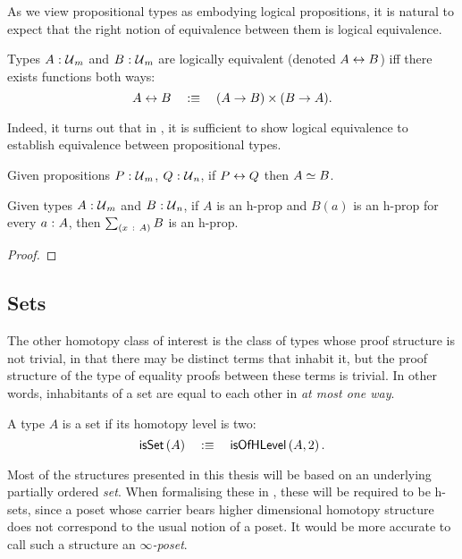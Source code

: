 As we view propositional types as embodying logical propositions, it is natural to
expect that the right notion of equivalence between them is logical equivalence.
\begin{defn}\label{defn:iff}
  Types $A\hspace{0.1mm}:\hspace{0.1mm}\mathcal{U}{}_m$ and $B\hspace{0.1mm}:\hspace{0.1mm}\mathcal{U}{}_m$ are logically equivalent
  (denoted $A \leftrightarrow B$) iff there exists functions both ways:
  \begin{equation*}
    A \leftrightarrow B \quad:\equiv\quad (A \rightarrow B) \times (B \rightarrow A).
  \end{equation*}
\end{defn}
Indeed, it turns out that in \UF{}, it is sufficient to show logical equivalence to
establish equivalence between propositional types.
\begin{prop}\label{prop:iff-equiv}
  Given propositions $P\hspace{0.1mm}:\hspace{0.1mm}\mathcal{U}{}_m$, $Q\hspace{0.1mm}:\hspace{0.1mm}\mathcal{U}{}_n$, if $P \leftrightarrow Q$
  then $A \simeq B$.
\end{prop}

\begin{prop}\label{prop:sigma-prop}
  Given types $A\hspace{0.1mm}:\hspace{0.1mm}\mathcal{U}{}_m$ and $B\hspace{0.1mm}:\hspace{0.1mm}\mathcal{U}{}_n$, if $A$ is an h-prop and
  $B(a)$ is an h-prop for every $a\hspace{0.1mm}:\hspace{0.1mm}A$, then $\sum_{(x~:~A)} B$ is an h-prop.
\end{prop}
\begin{proof}
\end{proof}

\subsection{Sets}

The other homotopy class of interest is the class of types whose proof structure is not
trivial, in that there may be distinct terms that inhabit it, but the proof structure of
the type of equality proofs between these terms is trivial. In other words, inhabitants of
a set are equal to each other in \emph{at most one way}.
\begin{defn}[Set]\label{defn:hset}
  A type $A$ is a set if its homotopy level is two:
  \begin{equation*}
    \mathsf{isSet}\left(A\right) \quad:\equiv\quad \mathsf{isOfHLevel}\left(A, 2\right).
  \end{equation*}
\end{defn}

Most of the structures presented in this thesis will be based on an underlying partially
ordered \emph{set}. When formalising these in \UF{}, these will be required to be h-sets,
since a poset whose carrier bears higher dimensional homotopy structure does not
correspond to the usual notion of a poset. It would be more accurate to call such a
structure an \emph{$\infty$-poset}.

